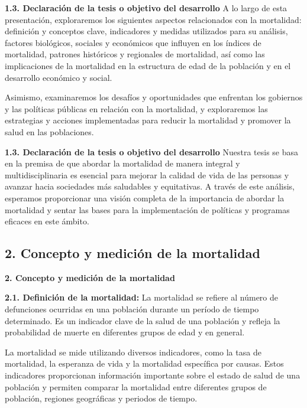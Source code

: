 \documentclass[8pt,a4paper]{beamer}
\begin{document}
{\begin{frame}{}
\begin{block}{\textbf{1.3. Declaración de la tesis o objetivo del desarrollo}}
A lo largo de esta presentación, exploraremos los siguientes aspectos relacionados con la mortalidad: definición y conceptos clave, indicadores y medidas utilizados para su análisis, factores biológicos, sociales y económicos que influyen en los índices de mortalidad, patrones históricos y regionales de mortalidad, así como las implicaciones de la mortalidad en la estructura de edad de la población y en el desarrollo económico y social.

Asimismo, examinaremos los desafíos y oportunidades que enfrentan los gobiernos y las políticas públicas en relación con la mortalidad, y exploraremos las estrategias y acciones implementadas para reducir la mortalidad y promover la salud en las poblaciones.

\end{block}
\end{frame}

\begin{frame}{}
\begin{block}{\textbf{1.3. Declaración de la tesis o objetivo del desarrollo}}
\setlength{\parskip}{3px}
\justifying
Nuestra tesis se basa en la premisa de que abordar la mortalidad de manera integral y multidisciplinaria es esencial para mejorar la calidad de vida de las personas y avanzar hacia sociedades más saludables y equitativas. A través de este análisis, esperamos proporcionar una visión completa de la importancia de abordar la mortalidad y sentar las bases para la implementación de políticas y programas eficaces en este ámbito.
\end{block}
\end{frame}

\subsection{2. Concepto y medición de la mortalidad}
\begin{frame}{\textbf{2. Concepto y medición de la mortalidad}}
\begin{block}{\textbf{2.1. Definición de la mortalidad:}}
\setlength{\parskip}{3px}
\justifying
La mortalidad se refiere al número de defunciones ocurridas en una población durante un período de tiempo determinado. Es un indicador clave de la salud de una población y refleja la probabilidad de muerte en diferentes grupos de edad y en general.

La mortalidad se mide utilizando diversos indicadores, como la tasa de mortalidad, la esperanza de vida y la mortalidad específica por causas. Estos indicadores proporcionan información importante sobre el estado de salud de una población y permiten comparar la mortalidad entre diferentes grupos de población, regiones geográficas y periodos de tiempo.


\end{block}
\end{frame}}
\end{document}
